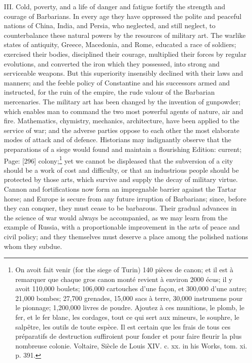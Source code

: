 III. Cold, poverty, and a life of danger and fatigue fortify the strength and courage of Barbarians. In every age they have oppressed the polite and peaceful nations of China, India, and Persia, who neglected, and still neglect, to counterbalance these natural powers by the resources of military art. The warlike states of antiquity, Greece, Macedonia, and Rome, educated a race of soldiers; exercised their bodies, disciplined their courage, multiplied their forces by regular evolutions, and converted the iron which they possessed, into strong and serviceable weapons. But this superiority insensibly declined with their laws and manners; and the feeble policy of Constantine and his successors armed and instructed, for the ruin of the empire, the rude valour of the Barbarian mercenaries. The military art has been changed by the invention of gunpowder; which enables man to command the two most powerful agents of nature, air and fire. Mathematics, chymistry, mechanics, architecture, have been applied to the service of war; and the adverse parties oppose to each other the most elaborate modes of attack and of defence. Historians may indignantly observe that the preparations of a siege would found and maintain a flourishing Edition: current; Page: [296] colony;\footnote{On avoit fait venir (for the siege of Turin) 140 pièces de canon; et il est à remarquer que chaque gros canon monté revient à environ 2000 écus; il y avoit 110,000 boulets; 106,000 cartouches d\texthebrew{}’une façon, et 300,000 d\texthebrew{}’une autre; 21,000 bombes; 27,700 grenades, 15,000 sacs à terre, 30,000 instrumens pour le pionnage; 1,200,000 livres de poudre. Ajoutez à ces munitions, le plomb, le fer, et le fer blanc, les cordages, tout ce qui sert aux mineurs, le souphre, le salpêtre, les outils de toute espèce. Il est certain que les frais de tous ces préparatifs de destruction suffiroient pour fonder et pour faire fleurir la plus nombreuse colonie. Voltaire, Siècle de Louis XIV. c. xx. in his Works, tom. xi. p. 391.} yet we cannot be displeased that the subversion of a city should be a work of cost and difficulty, or that an industrious people should be protected by those arts, which survive and supply the decay of military virtue. Cannon and fortifications now form an impregnable barrier against the Tartar horse; and Europe is secure from any future irruption of Barbarians; since, before they can conquer, they must cease to be barbarous. Their gradual advances in the science of war would always be accompanied, as we may learn from the example of Russia, with a proportionable improvement in the arts of peace and civil policy; and they themselves must deserve a place among the polished nations whom they subdue.

